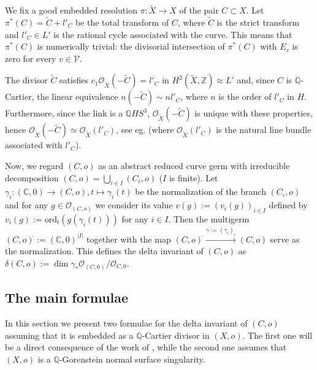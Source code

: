 \documentclass[12pt,a4paper]{amsart}
\def\cO{\mathcal{O}}
\theoremstyle{remark}
\theoremstyle{definition}
\begin{document}
We fix a good embedded resolution $\pi:\tilde X \to X$ of the pair $C\subset X$. Let $\pi^*(C)=\tilde C+l'_C$ be the total transform of $C$, where $\tilde C$ is the strict transform and $l'_C\in L'$ is the rational cycle associated with the curve. This means 
that $\pi^*(C)$ is numerically trivial: the divisorial intersection of $\pi^*(C)$ with $ E_v$ is zero for every $v\in \mathcal{V}$. 

The divisor $\tilde C$ satisfies $c_1\cO_{\tilde X}(-\tilde C)=l'_C$ in $H^2(\tilde{X}, \mathbb{Z})\approx L'$ and, 
since $C$ is $\mathbb{Q}$-Cartier,
the linear equivalence $n(-\tilde C)\sim nl'_C$,  where $n$ is the order of $l'_C$ in $H$. Furthermore, since the link is a $\mathbb{Q}HS^3$, $\cO_{\tilde X}(-\tilde C)$ is unique with these properties, hence $\cO_{\tilde X}(-\tilde C)\simeq \cO_{\tilde X}(l'_C)$, see eg. \cite[Prop. 6.1.16]{nbook} (where $\cO_{\tilde X}(l'_C)$ is the natural line bundle associated with $l'_C$). 

Now, we regard  $(C,o)$ as an abstract reduced curve germ with irreducible decomposition $(C,o)=\bigcup_{i\in I}(C_i,o)$ ($I$ is finite). Let $\gamma_i:(\mathbb{C},0)\to (C,o), t\mapsto \gamma_i(t)$ be the normalization of the branch $(C_i,o)$ and for any $g\in \cO_{(C,o)}$ we consider its value $v(g):=(v_i(g))_{i\in I}$ defined by $v_i(g):=\textrm{ord}_t(g(\gamma_i(t)))$ for any $i\in I$. Then the multigerm $(C,o)^{\widetilde{}} :=(\mathbb{C},0)^{\vert I\vert}$ together with the map $(C,o)^{\widetilde{}}  \stackrel{\gamma:=(\gamma_i)_i}{\longrightarrow} (C,o)$ serve as the normalization. This defines the delta invariant of $(C,o)$ as $\delta(C,o):=\dim \gamma_*\cO_{(C,0)^{\widetilde{}}}/\cO_{C,0}$.

\subsection{The main formulae}
In this section we present two formulae for the delta invariant of $(C,o)$ assuming that it is embedded as a $\mathbb{Q}$-Cartier divisor in $(X,o)$. The first one will be a direct consequence of the work of \cite{delta1}, while the second one assumes that $(X,o)$ is a $\mathbb{Q}$-Gorenstein normal surface singularity. 
\end{document}
